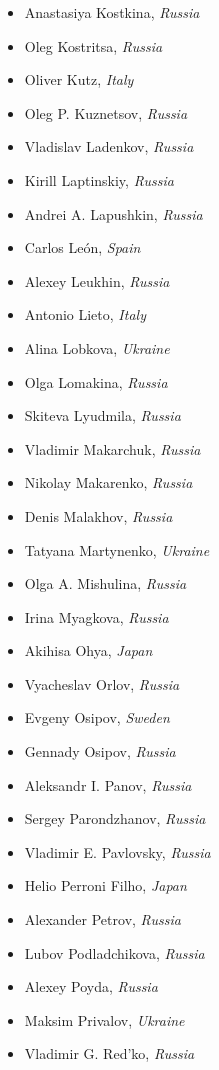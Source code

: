 \documentclass[10pt,fleqn,openany]{book} %
\begin{document}
\begin{multicols}{2}
\begin{itemize}
			\item Anastasiya Kostkina, \textit{Russia}
			\item Oleg Kostritsa, \textit{Russia}
			\item Oliver Kutz, \textit{Italy}
			\item Oleg P. Kuznetsov, \textit{Russia}
			\item Vladislav Ladenkov, \textit{Russia}
			\item Kirill Laptinskiy, \textit{Russia}
			\item Andrei A. Lapushkin, \textit{Russia}
			\item Carlos León, \textit{Spain}
			\item Alexey Leukhin, \textit{Russia}
			\item Antonio Lieto, \textit{Italy}
			\item Alina Lobkova, \textit{Ukraine}
			\item Olga Lomakina, \textit{Russia}
			\item Skiteva Lyudmila, \textit{Russia}
			\item Vladimir Makarchuk, \textit{Russia}
			\item Nikolay Makarenko, \textit{Russia}
			\item Denis Malakhov, \textit{Russia}
			\item Tatyana Martynenko, \textit{Ukraine}
			\item Olga A. Mishulina, \textit{Russia}
			\item Irina Myagkova, \textit{Russia}
			\item Akihisa Ohya, \textit{Japan}
			\item Vyacheslav Orlov, \textit{Russia}
			\item Evgeny Osipov, \textit{Sweden}
			\item Gennady Osipov, \textit{Russia}
			\item Aleksandr I. Panov, \textit{Russia}
			\item Sergey Parondzhanov, \textit{Russia}
			\item Vladimir E. Pavlovsky, \textit{Russia}
			\item Helio Perroni Filho, \textit{Japan}
			\item Alexander Petrov, \textit{Russia}
			\item Lubov Podladchikova, \textit{Russia}
			\item Alexey Poyda, \textit{Russia}
			\item Maksim Privalov, \textit{Ukraine}
			\item Vladimir G. Red'ko, \textit{Russia}

\end{itemize}
\end{multicols}
\end{document}
